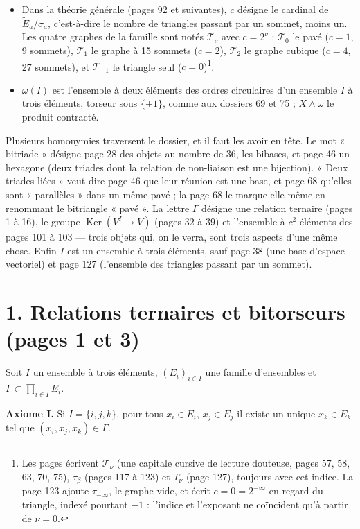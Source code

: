 \documentclass[11pt,a4paper]{article}
\begin{document}
\begin{itemize}
\item Dans la théorie générale (pages 92 et suivantes), $c$ désigne le cardinal
  de $\widetilde E_a / \sigma_a$, c'est-à-dire le nombre de triangles passant
  par un sommet, moins un. Les quatre graphes de la famille sont notés
  $\mathcal{T}_\nu$ avec $c = 2^\nu$ : $\mathcal{T}_0$ le pavé ($c = 1$, 9
  sommets), $\mathcal{T}_1$ le graphe à 15 sommets ($c = 2$), $\mathcal{T}_2$
  le graphe cubique ($c = 4$, 27 sommets), et $\mathcal{T}_{-1}$ le triangle
  seul ($c = 0$)\footnote{Les pages écrivent $\mathcal{T}_\nu$ (une capitale
  cursive de lecture douteuse, pages 57, 58, 63, 70, 75), $\tau_\beta$ (pages
  117 à 123) et $T_\nu$ (page 127), toujours avec cet indice. La page 123
  ajoute $\tau_{-\infty}$, le graphe vide, et écrit $c = 0 = 2^{-\infty}$ en
  regard du triangle, indexé pourtant $-1$ : l'indice et l'exposant ne
  coïncident qu'à partir de $\nu = 0$.}.
\item $\omega(I)$ est l'ensemble à deux éléments des ordres circulaires d'un
  ensemble $I$ à trois éléments, torseur sous $\lbrace \pm 1\rbrace$, comme aux
  dossiers 69 et 75 ; $X \wedge \omega$ le produit contracté.
\end{itemize}

Plusieurs homonymies traversent le dossier, et il faut les avoir en tête. Le
mot « bitriade » désigne page 28 des objets au nombre de 36, les bibases, et
page 46 un hexagone (deux triades dont la relation de non-liaison est une
bijection). « Deux triades liées » veut dire page 46 que leur réunion est une
base, et page 68 qu'elles sont « parallèles » dans un même pavé ; la page 68
le marque elle-même en renommant le bitriangle « pavé ». La lettre $\Gamma$
désigne une relation ternaire (pages 1 à 16), le groupe
$\operatorname{Ker}(V^I \to V)$ (pages 32 à 39) et l'ensemble à $c^2$
éléments des pages 101 à 103 --- trois objets qui, on le verra, sont trois
aspects d'une même chose. Enfin $I$ est un ensemble à trois éléments, sauf
page 38 (une base d'espace vectoriel) et page 127 (l'ensemble des triangles
passant par un sommet).

\section*{1. Relations ternaires et bitorseurs (pages 1 et 3)}

Soit $I$ un ensemble à trois éléments, $(E_i)_{i \in I}$ une famille
d'ensembles et $\Gamma \subset \prod_{i\in I} E_i$.

\textbf{Axiome I.} Si $I = \lbrace i, j, k\rbrace$, pour tous $x_i \in E_i$,
$x_j \in E_j$ il existe un unique $x_k \in E_k$ tel que $(x_i, x_j, x_k)
\in \Gamma$.
\end{document}
